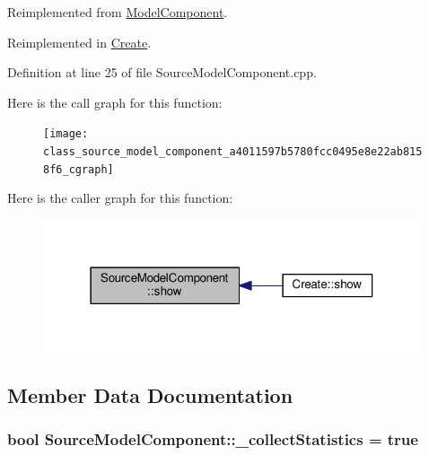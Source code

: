 Reimplemented from \hyperlink{class_model_component_ad8bc846e36b028eab7efb7da6c549eca}{Model\-Component}.



Reimplemented in \hyperlink{class_create_a8d1832d2165bbeea4a5a88aded883f86}{Create}.



Definition at line 25 of file Source\-Model\-Component.\-cpp.



Here is the call graph for this function\-:\nopagebreak
\begin{figure}[H]
\begin{center}
\leavevmode
\texttt{[image: class\_source\_model\_component\_a4011597b5780fcc0495e8e22ab8158f6\_cgraph]}
\end{center}
\end{figure}




Here is the caller graph for this function\-:\nopagebreak
\begin{figure}[H]
\begin{center}
\leavevmode
\includegraphics[width=316pt]{class_source_model_component_a4011597b5780fcc0495e8e22ab8158f6_icgraph}
\end{center}
\end{figure}




\subsection{Member Data Documentation}
\hypertarget{class_source_model_component_ac0c009ff9a2e8169d251118dabcd19eb}{
\subsubsection[{\-\_\-collect\-Statistics}]{\setlength{\rightskip}{0pt plus 5cm}bool Source\-Model\-Component\-::\-\_\-collect\-Statistics = true\hspace{0.3cm}{\ttfamily [protected]}}}\label{class_source_model_component_ac0c009ff9a2e8169d251118dabcd19eb}



